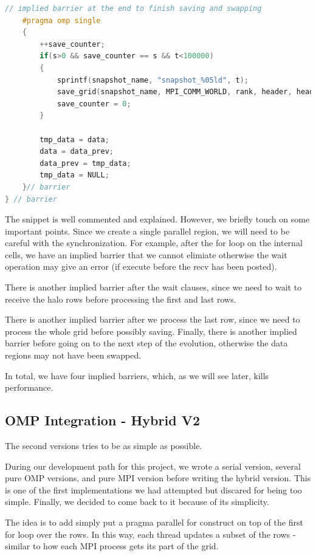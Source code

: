 \documentclass{report}
\begin{document}
\begin{lstlisting}[language=C++]
    // implied barrier at the end to finish saving and swapping
    #pragma omp single
    {
        ++save_counter;
        if(s>0 && save_counter == s && t<100000)
        {
            sprintf(snapshot_name, "snapshot_%05ld", t);
            save_grid(snapshot_name, MPI_COMM_WORLD, rank, header, header_size, my_total_file_offset, data, my_rows, cols);
            save_counter = 0;
        }

        tmp_data = data;
        data = data_prev;
        data_prev = tmp_data;
        tmp_data = NULL;
    }// barrier
} // barrier
\end{lstlisting}

The snippet is well commented and explained. However, we briefly touch on some 
important points. Since we create a single parallel region, we will need to 
be careful with the synchronization. For example, after the for loop on the 
internal cells, we have an implied barrier that we cannot elimiate otherwise the 
wait operation may give an error (if execute before the recv has been posted).

There is another implied barrier after the wait clauses, since we need to wait 
to receive the halo rows before processing the first and last rows.

There is another implied barrier after we process the last row, since 
we need to process the whole grid before possibly saving. Finally, there is another 
implied barrier before going on to the next step of the evolution, otherwise the 
data regions may not have been swapped.

In total, we have four implied barriers, which, as we will see later, kills  
performance.

\subsection{OMP Integration - Hybrid V2}

The second versions tries to be as simple as possible. 

During our development path for this project, we wrote a serial version, several
pure OMP versions, and pure MPI version before writing the hybrid version. 
This is one of the first implementations we had attempted but discared for being 
too simple. Finally, we decided to come back to it because of its simplicity. 

The idea is to add simply put a pragma parallel for construct on top of the 
first for loop over the rows. In this way, each thread updates a subset of the 
rows - similar to how each MPI process gets its part of the grid.
\end{document}
